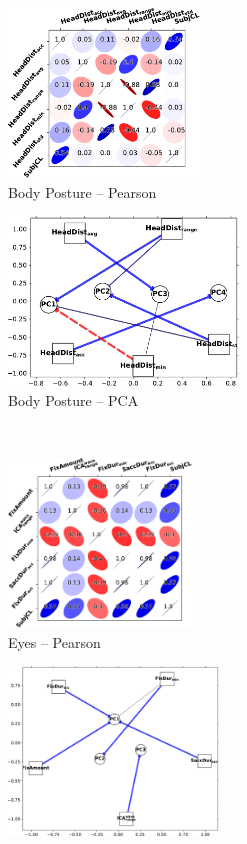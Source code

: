 \documentclass[output=paper]{langsci/langscibook}
\begin{document}
\begin{figure}
    \begin{subfigure}{0.5\textwidth}\centering
        \includegraphics[height=4.5cm]{figures/bodyposture-pearson-cropped.pdf}
        \caption{Body Posture -- Pearson}
    \end{subfigure}%
    \begin{subfigure}{0.5\textwidth}\centering
        \includegraphics[height=4.5cm]{figures/bodyposture-PCA-cropped.pdf}
        \caption{Body Posture -- PCA}
    \end{subfigure}\bigskip\\
    \begin{subfigure}{0.5\textwidth}\centering
        \includegraphics[height=4.5cm]{figures/eyes-pearson-cropped.pdf}
        \caption{Eyes -- Pearson}
    \end{subfigure}%
    \begin{subfigure}{0.5\textwidth}\centering
        \includegraphics[height=4.5cm]{figures/eyes-PCA-cropped.pdf}

\end{subfigure}
\end{figure}
\end{document}
